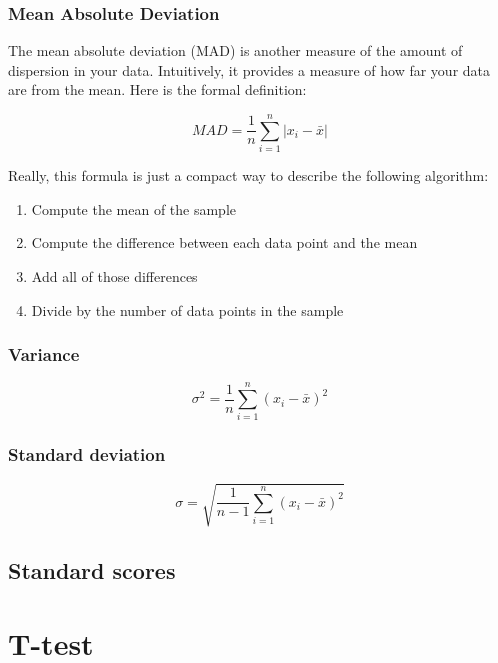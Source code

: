 \documentclass[]{book}
\providecommand{\tightlist}{%
  \setlength{\itemsep}{0pt}\setlength{\parskip}{0pt}}
\begin{document}
\subsection{Mean Absolute Deviation}\label{mean-absolute-deviation}

The mean absolute deviation (MAD) is another measure of the amount of
dispersion in your data. Intuitively, it provides a measure of how far
your data are from the mean. Here is the formal definition:

\[MAD = \frac{1}{n} \displaystyle\sum_{i=1}^{n} |x_i - \bar{x}|\]

Really, this formula is just a compact way to describe the following
algorithm:

\begin{enumerate}
\def\labelenumi{\arabic{enumi}.}
\tightlist
\item
  Compute the mean of the sample
\item
  Compute the difference between each data point and the mean
\item
  Add all of those differences
\item
  Divide by the number of data points in the sample
\end{enumerate}

\subsection{Variance}\label{variance}

\[\sigma^2 = \frac{1}{n} \displaystyle\sum_{i=1}^{n} (x_i - \bar{x})^2\]

\subsection{Standard deviation}\label{standard-deviation}

\[\sigma = \sqrt{\frac{1}{n-1} \displaystyle\sum_{i=1}^{n} (x_i - \bar{x})^2}\]

\section{Standard scores}\label{standard-scores}

\chapter{T-test}\label{t-test}


\end{document}
